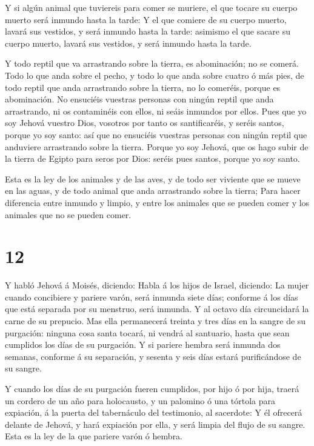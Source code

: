  Y si algún animal que tuviereis para comer se muriere, el
que tocare su cuerpo muerto será inmundo hasta la tarde:  Y
el que comiere de su cuerpo muerto, lavará sus vestidos, y será inmundo
hasta la tarde: asimismo el que sacare su cuerpo muerto, lavará sus
vestidos, y será inmundo hasta la tarde.

 Y todo reptil que va arrastrando sobre la tierra, es
abominación; no se comerá.  Todo lo que anda sobre el
pecho, y todo lo que anda sobre cuatro ó más pies, de todo reptil que
anda arrastrando sobre la tierra, no lo comeréis, porque es abominación.
 No ensuciéis vuestras personas con ningún reptil que anda
arrastrando, ni os contaminéis con ellos, ni seáis inmundos por ellos.
 Pues que yo soy Jehová vuestro Dios, vosotros por tanto os
santificaréis, y seréis santos, porque yo soy santo: así que no
ensuciéis vuestras personas con ningún reptil que anduviere arrastrando
sobre la tierra.  Porque yo soy Jehová, que os hago subir
de la tierra de Egipto para seros por Dios: seréis pues santos, porque
yo soy santo.

 Esta es la ley de los animales y de las aves, y de todo
ser viviente que se mueve en las aguas, y de todo animal que anda
arrastrando sobre la tierra;  Para hacer diferencia entre
inmundo y limpio, y entre los animales que se pueden comer y los
animales que no se pueden comer.

\hypertarget{section-11}{%
\section{12}\label{section-11}}

 Y habló Jehová á Moisés, diciendo:  Habla á los
hijos de Israel, diciendo: La mujer cuando concibiere y pariere varón,
será inmunda siete días; conforme á los días que está separada por su
menstruo, será inmunda.  Y al octavo día circuncidará la
carne de su prepucio.  Mas ella permanecerá treinta y tres
días en la sangre de su purgación: ninguna cosa santa tocará, ni vendrá
al santuario, hasta que sean cumplidos los días de su purgación.
 Y si pariere hembra será inmunda dos semanas, conforme á su
separación, y sesenta y seis días estará purificándose de su sangre.

 Y cuando los días de su purgación fueren cumplidos, por
hijo ó por hija, traerá un cordero de un año para holocausto, y un
palomino ó una tórtola para expiación, á la puerta del tabernáculo del
testimonio, al sacerdote:  Y él ofrecerá delante de Jehová,
y hará expiación por ella, y será limpia del flujo de su sangre. Esta es
la ley de la que pariere varón ó hembra.

